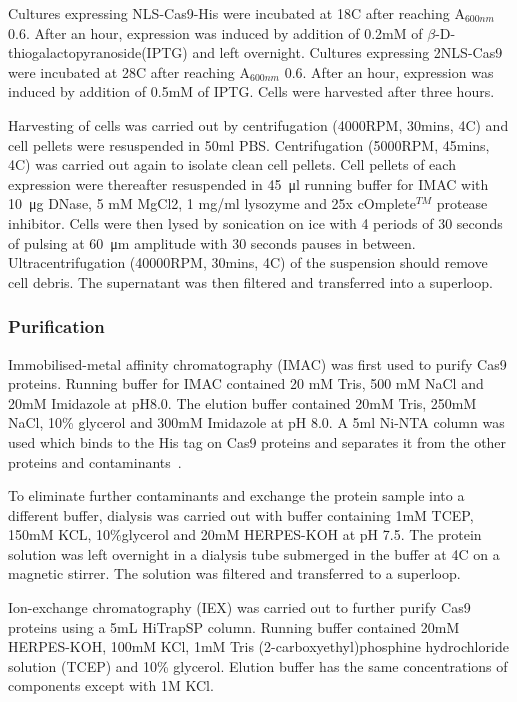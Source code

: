 \documentclass[11pt]{article}
\begin{document}
Cultures expressing NLS-Cas9-His were incubated at 18\degree C after reaching A$_{600nm}$ 0.6. After an hour, expression was induced by addition of 0.2mM of $\beta$-D-thiogalactopyranoside(IPTG) and left overnight. Cultures expressing 2NLS-Cas9 were incubated at 28\degree C after reaching A$_{600nm}$ 0.6. After an hour, expression was induced by addition of 0.5mM of IPTG. Cells were harvested after three hours. 

Harvesting of cells was carried out by centrifugation (4000RPM, 30mins, 4\degree C) and cell pellets were resuspended in 50ml PBS. Centrifugation (5000RPM, 45mins, 4\degree C) was carried out again to isolate clean cell pellets. Cell pellets of each expression were thereafter resuspended in \SI{45}{\micro\litre} running buffer for IMAC with \SI{10}{\micro\gram} DNase, 5 mM MgCl2, 1 mg/ml lysozyme and 25x cOmplete$^{TM}$  protease inhibitor. Cells were then lysed by sonication on ice with 4 periods of 30 seconds of pulsing at \SI{60}{\micro\metre} amplitude with 30 seconds pauses in between. Ultracentrifugation (40000RPM, 30mins, 4\degree C) of the suspension should remove cell debris. The supernatant was then filtered and transferred into a superloop. 

\subsubsection{Purification}
Immobilised-metal affinity chromatography (IMAC) was first used to purify Cas9 proteins. Running buffer for IMAC contained 20 mM Tris, 500 mM NaCl and 20mM Imidazole at pH8.0. The elution buffer contained 20mM Tris, 250mM NaCl, 10\% glycerol and 300mM Imidazole at pH 8.0. A 5ml Ni-NTA column was used which binds to the His tag on Cas9 proteins and separates it from the other proteins and contaminants~\citep{PORATH1975}. 

To eliminate further contaminants and exchange the protein sample into a different buffer, dialysis was carried out with buffer containing 1mM TCEP, 150mM KCL, 10\%glycerol and 20mM HERPES-KOH at pH 7.5. The protein solution was left overnight in a dialysis tube submerged in the buffer at 4\degree C on a magnetic stirrer. The solution was filtered and transferred to a superloop.

Ion-exchange chromatography (IEX) was carried out to further purify Cas9 proteins using a 5mL HiTrapSP column. Running buffer contained 20mM HERPES-KOH, 100mM KCl, 1mM Tris (2-carboxyethyl)phosphine hydrochloride solution (TCEP) and 10\% glycerol. Elution buffer has the same concentrations of components except with 1M KCl.
\end{document}
